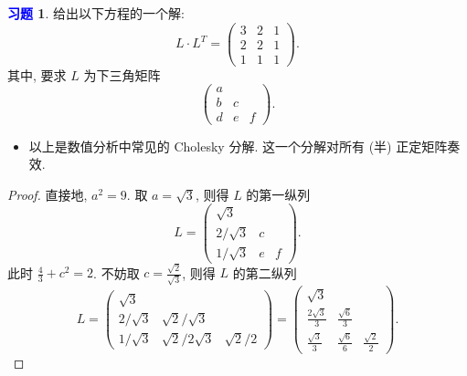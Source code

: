 \documentclass[11pt]{ctexart}
\theoremstyle{definition}
\numberwithin{equation}{section}
\theoremstyle{definition}
\newtheorem{exercise}{\textcolor{blue}{习题}}
\theoremstyle{remark}
\begin{document}
\begin{exercise}
    给出以下方程的一个解: 
\begin{equation}
    L\cdot L^T=\begin{pmatrix}3&2&1\\2&2&1\\1&1&1\end{pmatrix}. 
\end{equation}
其中, 要求 $L$ 为下三角矩阵
\begin{equation}
    \begin{pmatrix}a&\\b&c\\d&e&f\end{pmatrix}. 
\end{equation}
\begin{itemize}
    \item 以上是数值分析中常见的 Cholesky 分解. 这一个分解对所有 (半) 正定矩阵奏效.
\end{itemize} 
\begin{proof}
    直接地, $a^2=9$. 取 $a=\sqrt 3$, 则得 $L$ 的第一纵列
    \begin{equation}
        L=\begin{pmatrix}\sqrt 3&\\{2}/{\sqrt 3}&c\\{1}/{\sqrt 3}&e&f\end{pmatrix}. 
    \end{equation}
    此时 $\frac 43+c^2=2$. 不妨取 $c=\frac{\sqrt 2}{\sqrt 3}$, 则得 $L$ 的第二纵列
    \begin{equation}
        L=\begin{pmatrix}\sqrt 3&\\{2}/{\sqrt 3}&{\sqrt 2}/{\sqrt 3}\\{1}/{\sqrt 3}&{\sqrt 2}/{2\sqrt 3}&{\sqrt 2}/{2}\end{pmatrix}=\begin{pmatrix}\sqrt 3&\\\frac{2\sqrt 3}{3}&\frac{\sqrt 6}{3}\\\frac{\sqrt 3}{3}&\frac{\sqrt 6}{6}&\frac{\sqrt 2}{2}\end{pmatrix}. 
    \end{equation}
\end{proof}
\end{exercise}
\end{document}
